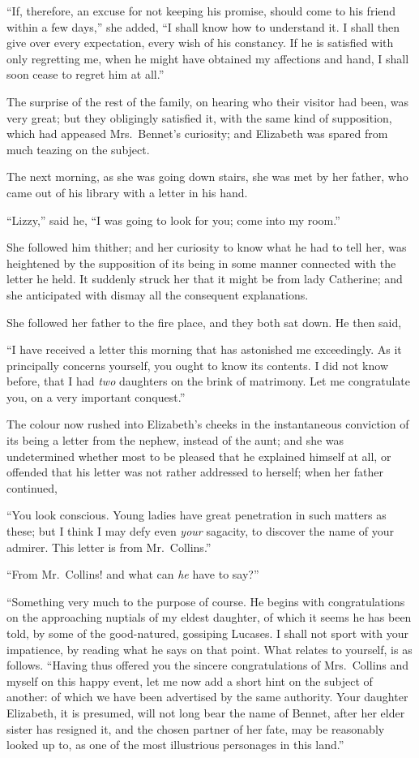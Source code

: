 “If, therefore, an excuse for not keeping his promise,
should come to his friend within a few days,” she added,
“I shall know how to understand it. I shall then give
over every expectation, every wish of his constancy. If
he is satisfied with only regretting me, when he might
have obtained my affections and hand, I shall soon cease
to regret him at all.”

\strut

The surprise of the rest of the family, on hearing who
their visitor had been, was very great; but they obligingly
satisfied it, with the same kind of supposition, which had
appeased Mrs.\ Bennet’s curiosity; and Elizabeth was
spared from much teazing on the subject.

The next morning, as she was going down stairs, she
was met by her father, who came out of his library with
a letter in his hand.

“Lizzy,” said he, “I was going to look for you; come
into my room.”

She followed him thither; and her curiosity to know
what he had to tell her, was heightened by the supposition
of its being in some manner connected with the letter he
held. It suddenly struck her that it might be from lady
Catherine; and she anticipated with dismay all the
consequent explanations.

She followed her father to the fire place, and they both
sat down. He then said,

“I have received a letter this morning that has astonished
me exceedingly. As it principally concerns yourself,
you ought to know its contents. I did not know before,
that I had \textit{two} daughters on the brink of matrimony. Let
me congratulate you, on a very important conquest.”

The colour now rushed into Elizabeth’s cheeks in the
instantaneous conviction of its being a letter from the
nephew, instead of the aunt; and she was undetermined
whether most to be pleased that he explained himself at
all, or offended that his letter was not rather addressed to
herself; when her father continued,

“You look conscious. Young ladies have great penetration
in such matters as these; but I think I may defy
even \textit{your} sagacity, to discover the name of your admirer.
This letter is from Mr.\ Collins.”

“From Mr.\ Collins! and what can \textit{he} have to say?”

“Something very much to the purpose of course. He
begins with congratulations on the approaching nuptials
of my eldest daughter, of which it seems he has been told,
by some of the good-natured, gossiping Lucases. I shall
not sport with your impatience, by reading what he says
on that point. What relates to yourself, is as follows.
“Having thus offered you the sincere congratulations of
Mrs.\ Collins and myself on this happy event, let me now
add a short hint on the subject of another: of which
we have been advertised by the same authority. Your
daughter Elizabeth, it is presumed, will not long bear the
name of Bennet, after her elder sister has resigned it,
and the chosen partner of her fate, may be reasonably
looked up to, as one of the most illustrious personages
in this land.”


